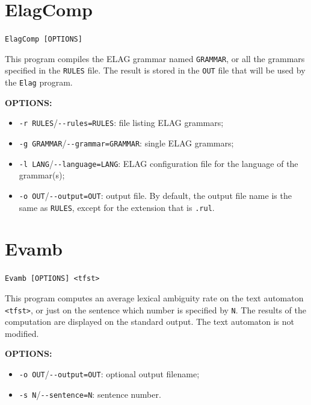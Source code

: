 \section{ElagComp}
\verb+ElagComp [OPTIONS]+

\bigskip
\noindent This program compiles the ELAG grammar named \verb+GRAMMAR+, or all
the grammars specified in the \verb+RULES+ file. The result is stored in the
\verb+OUT+ file that will be used by the \verb+Elag+ program.

\bigskip
\noindent \textbf{OPTIONS:}
\begin{itemize}
  \item \verb+-r RULES+/\verb+--rules=RULES+: file listing ELAG grammars;
  \item \verb+-g GRAMMAR+/\verb+--grammar=GRAMMAR+: single ELAG grammars;
  \item \verb+-l LANG+/\verb+--language=LANG+: ELAG configuration file for the language of the grammar(s);
  \item \verb+-o OUT+/\verb+--output=OUT+: output file. By default, the output file name is 
        the same as \verb+RULES+, except for the extension that is
        \verb+.rul+.
\end{itemize}








\section{Evamb}
\verb+Evamb [OPTIONS] <tfst>+

\bigskip
\noindent This program computes an average lexical ambiguity rate on the text
automaton \verb+<tfst>+, or just on the sentence which number is specified by
\verb+N+. The results of the computation are displayed on the standard output.
The text automaton is not modified.

\bigskip
\noindent \textbf{OPTIONS:}
\begin{itemize}
  \item \verb+-o OUT+/\verb+--output=OUT+: optional output filename;
  \item \verb+-s N+/\verb+--sentence=N+: sentence number.
\end{itemize}








